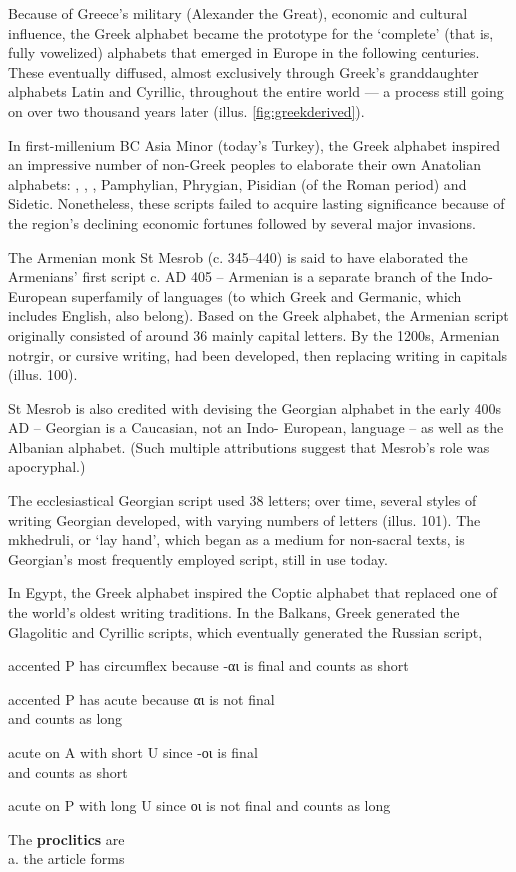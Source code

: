 Because of Greece’s military (Alexander the Great), economic
and cultural influence, the Greek alphabet became the
prototype for the ‘complete’ (that is, fully vowelized) alphabets
that emerged in Europe in the following centuries. These eventually
diffused, almost exclusively through Greek’s granddaughter
alphabets Latin and Cyrillic, throughout the entire
world --- a process still going on over two thousand years later
(illus. \ref{fig:greekderived}).

In first-millenium BC Asia Minor (today’s Turkey), the
Greek alphabet inspired an impressive number of non-Greek
peoples to elaborate their own Anatolian alphabets: ,
, , Pamphylian, Phrygian, Pisidian (of the Roman
period) and Sidetic.  Nonetheless, these scripts failed to
acquire lasting significance because of the region’s declining
economic fortunes followed by several major invasions.



The Armenian monk St Mesrob (c. 345–440) is said to have
elaborated the Armenians’ first script c. AD 405 – Armenian is a
separate branch of the Indo-European superfamily of languages
(to which Greek and Germanic, which includes English, also
belong). Based on the Greek alphabet, the Armenian script
originally consisted of around 36 mainly capital letters. By the
1200s, Armenian notrgir, or cursive writing, had been developed,
then replacing writing in capitals (illus. 100).

St Mesrob is also credited with devising the Georgian alphabet
in the early 400s AD – Georgian is a Caucasian, not an Indo-
European, language – as well as the Albanian alphabet. (Such
multiple attributions suggest that Mesrob’s role was apocryphal.)

The ecclesiastical Georgian script used 38 letters; over
time, several styles of writing Georgian developed, with varying
numbers of letters (illus. 101). The mkhedruli, or ‘lay hand’,
which began as a medium for non-sacral texts, is Georgian’s
most frequently employed script, still in use today.

In Egypt, the Greek alphabet inspired the Coptic
alphabet that replaced one of the world’s oldest writing traditions.
In the Balkans, Greek generated the Glagolitic and
Cyrillic scripts, which eventually generated the Russian script,




 accented P has circumflex because -αι is final
and counts as short

 accented P has acute because αι is not final\\
and counts as long

 acute on A with short U since -οι is final\\
and counts as short

 acute on P with long U since οι is not final
and counts as long


The \textbf{proclitics} are\\
a. the article forms 


